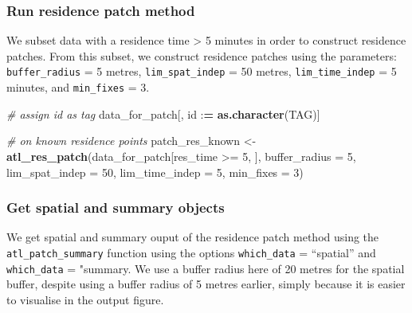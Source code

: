 \documentclass[]{scrartcl}
\newenvironment{Shaded}{}{}
\newcommand{\CommentTok}[1]{\textcolor[rgb]{0.38,0.63,0.69}{\textit{#1}}}
\newcommand{\DataTypeTok}[1]{\textcolor[rgb]{0.56,0.13,0.00}{#1}}
\newcommand{\DecValTok}[1]{\textcolor[rgb]{0.25,0.63,0.44}{#1}}
\newcommand{\ErrorTok}[1]{\textcolor[rgb]{1.00,0.00,0.00}{\textbf{#1}}}
\newcommand{\KeywordTok}[1]{\textcolor[rgb]{0.00,0.44,0.13}{\textbf{#1}}}
\newcommand{\NormalTok}[1]{#1}
\newcommand{\OperatorTok}[1]{\textcolor[rgb]{0.40,0.40,0.40}{#1}}
\newcommand{\StringTok}[1]{\textcolor[rgb]{0.25,0.44,0.63}{#1}}
\begin{document}
\hypertarget{run-residence-patch-method}{%
\subsubsection{Run residence patch method}\label{run-residence-patch-method}}

We subset data with a residence time \textgreater{} 5 minutes in order to construct residence patches.
From this subset, we construct residence patches using the parameters: \texttt{buffer\_radius} = 5 metres, \texttt{lim\_spat\_indep} = 50 metres, \texttt{lim\_time\_indep} = 5 minutes, and \texttt{min\_fixes} = 3.

\begin{Shaded}
\begin{Highlighting}[]
\CommentTok{# assign id as tag}
\NormalTok{data_for_patch[, id }\OperatorTok{:}\ErrorTok{=}\StringTok{ }\KeywordTok{as.character}\NormalTok{(TAG)]}

\CommentTok{# on known residence points}
\NormalTok{patch_res_known <-}\StringTok{ }\KeywordTok{atl_res_patch}\NormalTok{(data_for_patch[res_time }\OperatorTok{>=}\StringTok{ }\DecValTok{5}\NormalTok{, ], }
                                \DataTypeTok{buffer_radius =} \DecValTok{5}\NormalTok{,}
                                \DataTypeTok{lim_spat_indep =} \DecValTok{50}\NormalTok{,}
                                \DataTypeTok{lim_time_indep =} \DecValTok{5}\NormalTok{,}
                                \DataTypeTok{min_fixes =} \DecValTok{3}\NormalTok{)}
\end{Highlighting}
\end{Shaded}

\hypertarget{get-spatial-and-summary-objects}{%
\subsubsection{Get spatial and summary objects}\label{get-spatial-and-summary-objects}}

We get spatial and summary ouput of the residence patch method using the \texttt{atl\_patch\_summary} function using the options \texttt{which\_data} = ``spatial'' and \texttt{which\_data} = "summary.
We use a buffer radius here of 20 metres for the spatial buffer, despite using a buffer radius of 5 metres earlier, simply because it is easier to visualise in the output figure.
\end{document}

